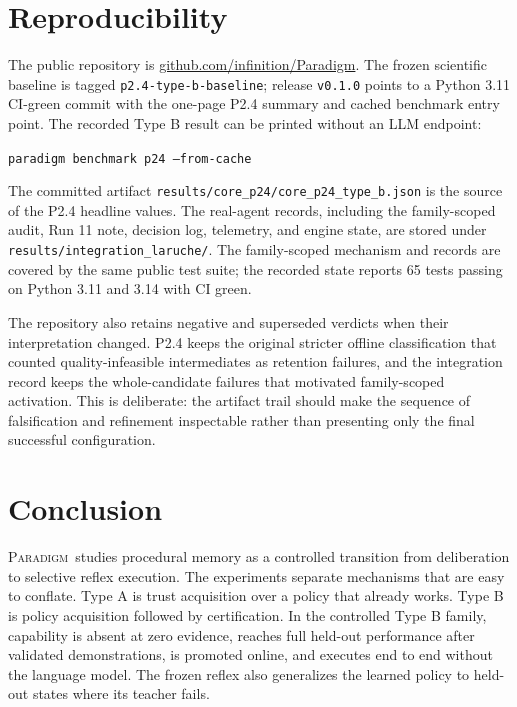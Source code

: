 \documentclass[10pt]{article}
\newcommand{\paradigm}{\textsc{Paradigm}}
\begin{document}
\section{Reproducibility}

The public repository is \href{https://github.com/infinition/Paradigm}{github.com/infinition/Paradigm}. The frozen scientific baseline is tagged \texttt{p2.4-type-b-baseline}; release \texttt{v0.1.0} points to a Python 3.11 CI-green commit with the one-page P2.4 summary and cached benchmark entry point. The recorded Type B result can be printed without an LLM endpoint:

\begin{center}
\texttt{paradigm benchmark p24 --from-cache}
\end{center}

The committed artifact \texttt{results/core\_p24/core\_p24\_type\_b.json} is the source of the P2.4 headline values. The real-agent records, including the family-scoped audit, Run 11 note, decision log, telemetry, and engine state, are stored under \texttt{results/integration\_laruche/}. The family-scoped mechanism and records are covered by the same public test suite; the recorded state reports 65 tests passing on Python 3.11 and 3.14 with CI green.

The repository also retains negative and superseded verdicts when their interpretation changed. P2.4 keeps the original stricter offline classification that counted quality-infeasible intermediates as retention failures, and the integration record keeps the whole-candidate failures that motivated family-scoped activation. This is deliberate: the artifact trail should make the sequence of falsification and refinement inspectable rather than presenting only the final successful configuration.

\section{Conclusion}

\paradigm\ studies procedural memory as a controlled transition from deliberation to selective reflex execution. The experiments separate mechanisms that are easy to conflate. Type A is trust acquisition over a policy that already works. Type B is policy acquisition followed by certification. In the controlled Type B family, capability is absent at zero evidence, reaches full held-out performance after validated demonstrations, is promoted online, and executes end to end without the language model. The frozen reflex also generalizes the learned policy to held-out states where its teacher fails.
\end{document}
